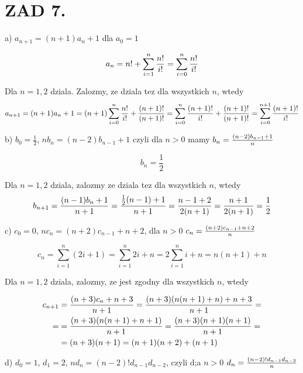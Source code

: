 \documentclass{article}[13pt]
\begin{document}
    \section*{ZAD 7.}
    
    a) $a_{n+1}=(n+1)a_n+1$ dla $a_0=1$

    \begin{align*}
        a_n=n!+\sum\limits_{i=1}^n{n!\over i!}=\sum\limits_{i=0}^n{n!\over i!}
    \end{align*}
    
    Dla $n=1,2$ dziala. Zalozmy, ze dziala tez dla wszystkich $n$, wtedy
    \begin{align*}
        a_{n+1}=(n+1)a_n+1=(n+1)\sum\limits_{i=0}^n{n!\over i!}+{(n+1)!\over(n+1)!}=\sum\limits_{i=0}^n{(n+1)!\over i!}+{(n+1)!\over(n+1)!}=\sum\limits_{i=0}^{n+1}{(n+1)!\over i!}
    \end{align*}

    \medskip
    
    b) $b_0=\frac12$, $nb_n=(n-2)b_{n-1}+1$ czyli dla $n>0$ mamy $b_n={(n-2)b_{n-1}+1\over n}$

    $$b_n=\frac12$$

    Dla $n=1,2$ dziala, zalozmy ze dziala tez dla wszystkich $n$, wtedy
    \begin{align*}
        b_{n+1}={(n-1)b_{n}+1\over n+1}={\frac12(n-1)+1\over n+1}={n-1+2\over 2(n+1)}={n+1\over 2(n+1)}=\frac12
    \end{align*}

    \medskip

    c) $c_0=0$, $nc_n=(n+2)c_{n-1}+n+2$, dla $n>0$ $c_n={(n+2)c_{n-1}+n+2\over n}$

    $$c_n=\sum\limits_{i=1}^n(2i+1)=\sum\limits_{i=1}^n2i+n=2\sum\limits_{i=1}^ni+n=n(n+1)+n$$

    Dla $n=1,2$ dziala, zalozmy, ze jest zgodny dla wszystkich $n$, wtedy

    \begin{align*}
        c_{n+1}&={(n+3)c_n+n+3\over n+1}={(n+3)(n(n+1)+n)+n+3\over n+1}=\\=
        &={(n+3)(n(n+1)+n+1)\over n+1}={(n+3)(n+1)(n+1)\over n+1}=\\
        &=(n+3)(n+1)=(n+1)(n+2)+(n+1)
    \end{align*}

    \medskip

    d) $d_0=1$, $d_1=2$, $nd_n=(n-2)!d_{n-1}d_{n-2}$, czyli d;a $n>0$ $d_n={(n-2)!d_{n-1}d_{n-2}\over n}$
\end{document}
